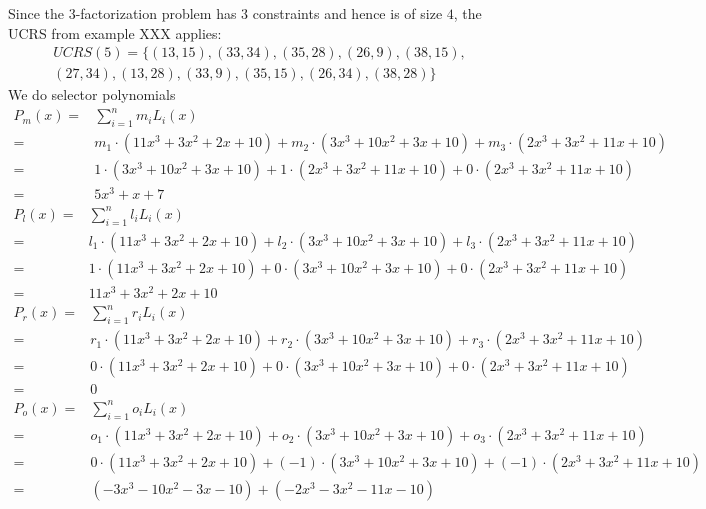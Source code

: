 \begin{example}
Since the $3$-factorization problem has $3$ constraints and hence is of size $4$, the  UCRS from example XXX applies:
\begin{multline*}
UCRS(5) =\{(13,15), (33,34), (35,28), (26,9), (38,15), \\
(27,34), (13,28), (33,9), (35,15), (26,34), (38,28)\}
\end{multline*}
We do selector polynomials
$$
\begin{array}{rl}
P_{m}(x) = & \sum_{i=1}^{n} {m_i}L_i(x)\\         
         = & m_1\cdot(11x^3 +3x^2 +2x + 10) + m_2\cdot (3x^3 +10x^2+ 3x + 10) + m_3\cdot (2x^3 + 3x^2 +11x +10) \\        
         = &  1\cdot (3x^3 +10x^2+ 3x + 10) + 1\cdot (2x^3 + 3x^2 +11x +10) +  0 \cdot (2x^3 + 3x^2 +11x +10)\\
         = & 5x^3 + x + 7
\end{array}
$$
$$
\begin{array}{rl}
P_{l}(x) = & \sum_{i=1}^{n} {l_i}L_i(x)\\         
         = & l_1\cdot(11x^3 +3x^2 +2x + 10) + l_2\cdot (3x^3 +10x^2+ 3x + 10) + l_3\cdot (2x^3 + 3x^2 +11x +10) \\            
         = & 1\cdot(11x^3 +3x^2 +2x + 10) + 0\cdot (3x^3 +10x^2+ 3x + 10) + 0\cdot (2x^3 + 3x^2 +11x +10) \\ 
         = & 11x^3 +3x^2 +2x + 10 
\end{array}
$$
$$
\begin{array}{rl}
P_{r}(x) = & \sum_{i=1}^{n} {r_i}L_i(x)\\         
         = & r_1\cdot(11x^3 +3x^2 +2x + 10) + r_2\cdot (3x^3 +10x^2+ 3x + 10) + r_3\cdot (2x^3 + 3x^2 +11x +10) \\ 
         = & 0\cdot(11x^3 +3x^2 +2x + 10) + 0\cdot (3x^3 +10x^2+ 3x + 10) + 0\cdot (2x^3 + 3x^2 +11x +10) \\          
         = & 0          
\end{array}
$$
$$
\begin{array}{rl}
P_{o}(x) = & \sum_{i=1}^{n} {o_i}L_i(x)\\         
         = & o_1\cdot(11x^3 +3x^2 +2x + 10) + o_2\cdot (3x^3 +10x^2+ 3x + 10) + o_3\cdot (2x^3 + 3x^2 +11x +10) \\
         = & 0\cdot(11x^3 +3x^2 +2x + 10) + (-1)\cdot (3x^3 +10x^2+ 3x + 10) + (-1)\cdot (2x^3 + 3x^2 +11x +10) \\  
         = & (-3x^3 -10x^2 - 3x - 10) + (-2x^3 - 3x^2 -11x -10) \\ 

\end{array}$$
\end{example}
